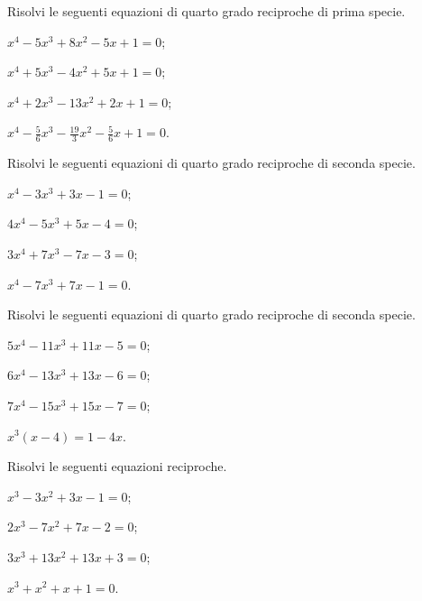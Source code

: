 \begin{esercizio}[\Ast]
\label{ese:5.44}
Risolvi le seguenti equazioni di quarto grado reciproche di prima specie.
\begin{multicols}{2}
\begin{enumeratea}
\item $x^4-5x^3+8x^2-5x+1=0$;
\item $x^4+5x^3-4x^2+5x+1=0$;
\item $x^4+2x^3-13x^2+2x+1=0$;
\item $x^4-\frac 5 6x^3-\frac{19} 3x^2-\frac 5 6x+1=0$.
\end{enumeratea}
\end{multicols}
\end{esercizio}

\begin{esercizio}[\Ast]
 \label{ese:5.45}
Risolvi le seguenti equazioni di quarto grado reciproche di seconda specie.
\begin{multicols}{2}
\begin{enumeratea}
\item $x^4-3x^3+3x-1=0$;
\item $4x^4-5x^3+5x-4=0$;
\item $3x^4+7x^3-7x-3=0$;
\item $x^4-7x^3+7x-1=0$.
\end{enumeratea}
\end{multicols}
\end{esercizio}
\pagebreak

\begin{esercizio}[\Ast]
 \label{ese:5.46}
Risolvi le seguenti equazioni di quarto grado reciproche di seconda specie.
\begin{multicols}{2}
\begin{enumeratea}
\item $5x^4-11x^3+11x-5=0$;
\item $6x^4-13x^3+13x-6=0$;
\item $7x^4-15x^3+15x-7=0$;
\item $x^3(x-4)=1-4x$.
\end{enumeratea}
\end{multicols}
\end{esercizio}

\begin{esercizio}[\Ast]
 \label{ese:5.47}
Risolvi le seguenti equazioni reciproche.
\begin{multicols}{2}
\begin{enumeratea}
\item $x^{3}-3x^{2}+3x-1=0$;
\item $2x^{3}-7x^{2}+7x-2=0$;
\item $3x^{3}+13x^{2}+13x+3=0$;
\item $x^{3}+x^{2}+x+1=0$.
\end{enumeratea}
\end{multicols}
\end{esercizio}

